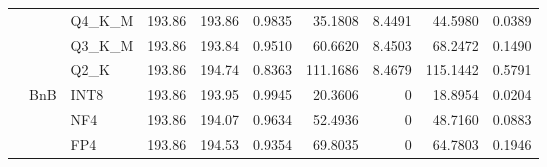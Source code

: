 \begin{table}[t]
{\begin{tabular}{ll l rrrrrrr}
 &  & Q4\_K\_M & 193.86 & 193.86 & 0.9835 & 35.1808 & 8.4491 & 44.5980 & 0.0389 \\
 &  & Q3\_K\_M & 193.86 & 193.84 & 0.9510 & 60.6620 & 8.4503 & 68.2472 & 0.1490 \\
 &  & Q2\_K & 193.86 & 194.74 & \cellcolor{red!18} 0.8363 & \cellcolor{red!18} 111.1686 & 8.4679 & \cellcolor{red!18} 115.1442 & \cellcolor{red!18} 0.5791 \\
 & BnB & INT8 & 193.86 & 193.95 & 0.9945 & 20.3606 & \cellcolor{cyan!12} $0$ & 18.8954 & 0.0204 \\
 &  & NF4 & 193.86 & 194.07 & 0.9634 & 52.4936 & \cellcolor{cyan!12} $0$ & 48.7160 & 0.0883 \\
 &  & FP4 & 193.86 & 194.53 & \cellcolor{red!18} 0.9354 & \cellcolor{red!18} 69.8035 & \cellcolor{cyan!12} $0$ & \cellcolor{red!18} 64.7803 & \cellcolor{red!18} 0.1946 \\
\bottomrule
\end{tabular}}
\end{table}